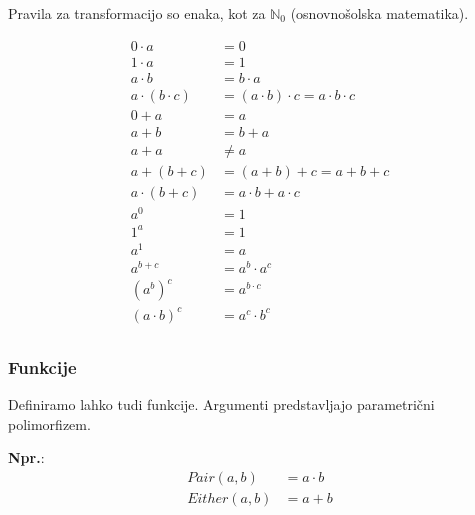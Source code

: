 \documentclass{report}
\newcommand{\Ex}{\textbf{Npr.}:\ }
\newcommand{\Seq}{\cdot}
\newcommand{\Sum}{\mathrel{+}}
\newcommand{\Var}[1]{{#1}}
\begin{document}
Pravila za transformacijo so enaka, kot za $\mathbb{N}_0$ (osnovnošolska matematika).
\begin{tcolorbox}[title={Pravila}]
  \begin{equation*}
    \begin{aligned}
      0 \Seq \Var{a} &= 0\\
      1 \Seq \Var{a} &= 1\\
      \Var{a} \Seq \Var{b} &= \Var{b} \Seq \Var{a}\\
      \Var{a} \Seq (\Var{b} \Seq \Var{c}) &= (\Var{a} \Seq \Var{b}) \Seq \Var{c} = \Var{a} \Seq \Var{b} \Seq \Var{c}\\
      0 \Sum \Var{a} &= \Var{a}\\
      \Var{a} \Sum \Var{b} &= \Var{b} \Sum \Var{a}\\
      \Var{a} \Sum \Var{a} &\neq \Var{a}\\
      \Var{a} \Sum (\Var{b} \Sum \Var{c}) &= (\Var{a} \Sum \Var{b}) \Sum \Var{c} = \Var{a} \Sum \Var{b} \Sum \Var{c} \\
      \Var{a} \Seq (\Var{b} \Sum \Var{c}) &= \Var{a} \Seq \Var{b} \Sum \Var{a} \Seq \Var{c}\\
      \Var{a}^0 &= 1\\
      1^\Var{a} &= 1\\
      \Var{a}^1 &= \Var{a}\\
      \Var{a}^{\Var{b} \Sum \Var{c}} &= \Var{a}^\Var{b} \Seq \Var{a}^\Var{c}\\
      (\Var{a}^{\Var{b}})^\Var{c} &= \Var{a}^{\Var{b} \Seq \Var{c}}\\
      (\Var{a}\Seq \Var{b})^\Var{c} &= \Var{a}^\Var{c} \Seq \Var{b}^\Var{c}\\
    \end{aligned}
  \end{equation*}
\end{tcolorbox}

\subsubsection*{Funkcije}
Definiramo lahko tudi funkcije.
Argumenti predstavljajo parametrični polimorfizem.

\Ex
\begin{equation*}
  \begin{aligned}
    Pair(a, b) &= a \Seq b\\
    Either(a, b) &= a \Sum b\\
  \end{aligned}
\end{equation*}
\end{document}
